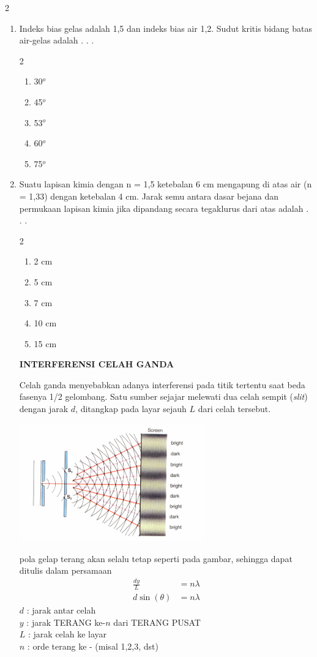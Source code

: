 \documentclass[10pt,a4paper]{extarticle}
\newcommand{\pilgani}[1]{                            \vspace{-0.3cm}\begin{multicols}{2}
 \begin{enumerate}[label=\Alph*., itemsep=0pt,topsep=0pt,leftmargin=*,align=Center]#1                     \end{enumerate}
 \phantom{ini cuma sapi, wedus, dan ayam}
 \end{multicols}}
\begin{document}
\begin{multicols*}{2}
\begin{enumerate}
\item Indeks bias gelas adalah 1,5 dan indeks bias air 1,2. Sudut kritis bidang batas air-gelas adalah . . .
\pilgani{
        \item 30$^o$
        \item 45$^o$
        \item 53$^o$
        \item 60$^o$
        \item 75$^o$
        }
\vspace{2cm}
\item Suatu lapisan kimia dengan n = 1,5 ketebalan 6 cm mengapung di atas air (n = 1,33) dengan ketebalan 4 cm. Jarak semu antara dasar bejana dan permukaan lapisan kimia jika dipandang secara tegaklurus dari atas adalah  . . . 
\pilgani{
        \item 2 cm
        \item 5 cm
        \item 7 cm
        \item 10 cm
        \item 15 cm
        }
\vspace{3cm}


\textbf{INTERFERENSI CELAH GANDA}

Celah ganda menyebabkan adanya interferensi pada titik tertentu saat beda fasenya 1/2 gelombang. Satu sumber sejajar melewati dua celah sempit (\textit{slit}) dengan jarak $d$, ditangkap pada layar sejauh $L$ dari celah tersebut.

\includegraphics[width=8cm]{pic/interganda}

pola gelap terang akan selalu tetap seperti pada gambar, sehingga dapat ditulis dalam persamaan
\begin{align*}
\frac{dy}{L} &= n \lambda\\
d \sin (\theta) &= n \lambda
\end{align*}
$d$ : jarak antar celah\\
$y$ : jarak TERANG ke-$n$ dari TERANG PUSAT\\
$L$ : jarak celah ke layar\\ 
$n$ : orde terang ke - (misal 1,2,3, dst)\\



\end{enumerate}
\end{multicols*}
\end{document}
